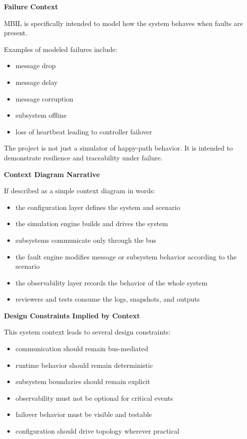 \documentclass[12pt]{article}
\begin{document}
\textbf{Failure Context}

MBIL is specifically intended to model how the system behaves when faults are present.

Examples of modeled failures include:
\begin{itemize}[leftmargin=*]
    \item message drop
    \item message delay
    \item message corruption
    \item subsystem offline
    \item loss of heartbeat leading to controller failover
\end{itemize}

The project is not just a simulator of happy-path behavior. It is intended to demonstrate resilience and traceability under failure.

\textbf{Context Diagram Narrative}

If described as a simple context diagram in words:
\begin{itemize}[leftmargin=*]
    \item the configuration layer defines the system and scenario
    \item the simulation engine builds and drives the system
    \item subsystems communicate only through the bus
    \item the fault engine modifies message or subsystem behavior according to the scenario
    \item the observability layer records the behavior of the whole system
    \item reviewers and tests consume the logs, snapshots, and outputs
\end{itemize}

\textbf{Design Constraints Implied by Context}

This system context leads to several design constraints:
\begin{itemize}[leftmargin=*]
    \item communication should remain bus-mediated
    \item runtime behavior should remain deterministic
    \item subsystem boundaries should remain explicit
    \item observability must not be optional for critical events
    \item failover behavior must be visible and testable
    \item configuration should drive topology wherever practical
\end{itemize}
\end{document}
